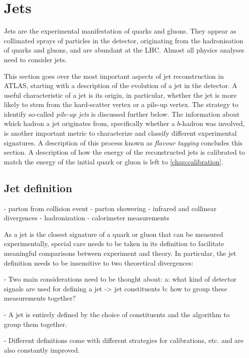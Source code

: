 \section{Jets}
Jets are the experimental manifestation of quarks and gluons.
They appear as collimated sprays of particles in the detector, originating from the hadronisation of quarks and gluons, and are abundant at the LHC. Almost all physics analyses need to consider jets.

This section goes over the most important aspects of jet reconstruction in ATLAS, starting with a description of the evolution of a jet in the detector. 
A useful characteristic of a jet is its origin, in particular, whether the jet is more likely to stem from the hard-scatter vertex or a pile-up vertex. The strategy to identify so-called \emph{pile-up jets} is discussed further below.
The information about which hadron a jet originates from, specifically whether a $b$-hadron was involved, is another important metric to characterize and classify different experimental signatures. A description of this process known as \emph{flavour tagging} concludes this section.
A description of how the energy of the reconstructed jets is calibrated to match the energy of the initial quark or gluon is left to \cref{chap:calibration}. 

\subsection{Jet definition}
- parton from collision event
- parton showering
    - infrared and collinear divergences
- hadronization
- calorimeter measurements

As a jet is the closest signature of a quark or gluon that can be measured experimentally, special care needs to be taken in its definition to facilitate meaningful comparisons between experiment and theory.
In particular, the jet definition needs to be insensitive to two theoretical divergences:

- Two main considerations need to be thought about:
    a: what kind of detector signals are used for defining a jet -> jet constituents
    b: how to group these measurements together? 

- A jet is entirely defined by the choice of constituents and the algorithm to group them together.

- Different definitions come with different strategies for calibrations, etc.  and are also constantly improved. 


